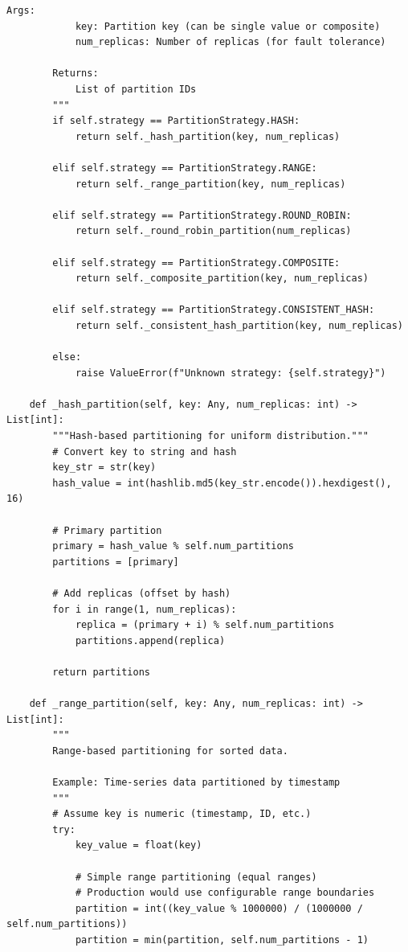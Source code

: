 \begin{lstlisting}[style=python, caption={Data Partitioning Strategies}]
        Args:
            key: Partition key (can be single value or composite)
            num_replicas: Number of replicas (for fault tolerance)

        Returns:
            List of partition IDs
        """
        if self.strategy == PartitionStrategy.HASH:
            return self._hash_partition(key, num_replicas)

        elif self.strategy == PartitionStrategy.RANGE:
            return self._range_partition(key, num_replicas)

        elif self.strategy == PartitionStrategy.ROUND_ROBIN:
            return self._round_robin_partition(num_replicas)

        elif self.strategy == PartitionStrategy.COMPOSITE:
            return self._composite_partition(key, num_replicas)

        elif self.strategy == PartitionStrategy.CONSISTENT_HASH:
            return self._consistent_hash_partition(key, num_replicas)

        else:
            raise ValueError(f"Unknown strategy: {self.strategy}")

    def _hash_partition(self, key: Any, num_replicas: int) -> List[int]:
        """Hash-based partitioning for uniform distribution."""
        # Convert key to string and hash
        key_str = str(key)
        hash_value = int(hashlib.md5(key_str.encode()).hexdigest(), 16)

        # Primary partition
        primary = hash_value % self.num_partitions
        partitions = [primary]

        # Add replicas (offset by hash)
        for i in range(1, num_replicas):
            replica = (primary + i) % self.num_partitions
            partitions.append(replica)

        return partitions

    def _range_partition(self, key: Any, num_replicas: int) -> List[int]:
        """
        Range-based partitioning for sorted data.

        Example: Time-series data partitioned by timestamp
        """
        # Assume key is numeric (timestamp, ID, etc.)
        try:
            key_value = float(key)

            # Simple range partitioning (equal ranges)
            # Production would use configurable range boundaries
            partition = int((key_value % 1000000) / (1000000 / self.num_partitions))
            partition = min(partition, self.num_partitions - 1)


\end{lstlisting}
